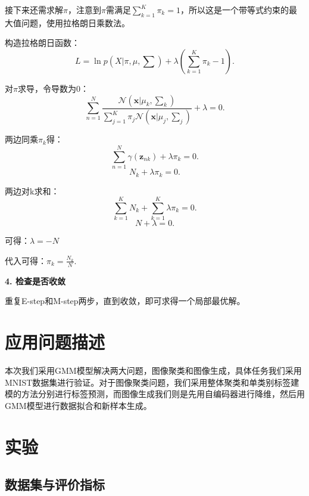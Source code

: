 \documentclass[UTF8]{ctexart}
\begin{document}
接下来还需求解$\pi$，注意到$\pi$需满足$\sum_{k=1}^K\pi_k=1$，所以这是一个带等式约束的最大值问题，使用拉格朗日乘数法。

构造拉格朗日函数：
\begin{equation}
  L=\ln p\left(X\big|\pi,\mu,\sum\right)+\lambda\left(\sum_{k=1}^K\pi_k-1\right).
\end{equation}

对$\pi$求导，令导数为0：
\begin{equation}
  \sum_{n=1}^N\frac{\mathcal N\left(\mathbf x\big|\mu_k,\sum_k\right)}{\sum_{j=1}^K\pi_j\mathcal N\left(\mathbf x\big|\mu_j,\sum_j\right)}+\lambda=0.
\end{equation}

两边同乘$\pi_k$得：
\begin{equation}
  \sum_{n=1}^N\gamma (\mathbf z_{nk}) + \lambda\pi_k=0.
\end{equation}
\begin{equation}
  N_k+\lambda\pi_k=0.
\end{equation}

两边对k求和：
\begin{equation}
  \sum_{k=1}^KN_k+\sum_{k=1}^K\lambda\pi_k=0.
\end{equation}
\begin{equation}
  N+\lambda=0.
\end{equation}

可得：$\lambda=-N$

代入可得：$\pi_k=\frac{N_k}{N}.$

\textbf{4. 检查是否收敛}

重复E-step和M-step两步，直到收敛，即可求得一个局部最优解。


\section{应用问题描述}

本次我们采用GMM模型解决两大问题，图像聚类和图像生成，具体任务我们采用MNIST数据集进行验证。对于图像聚类问题，我们采用整体聚类和单类别标签建模的方法分别进行标签预测，而图像生成我们则是先用自编码器进行降维，然后用GMM模型进行数据拟合和新样本生成。


\section{实验}

\subsection{数据集与评价指标}
\end{document}
